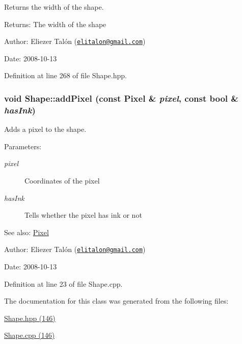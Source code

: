 Returns the width of the shape. 

\begin{Desc}
\item[Returns:]The width of the shape\end{Desc}
\begin{Desc}
\item[Author:]Eliezer Talón (\href{mailto:elitalon@gmail.com}{\tt elitalon@gmail.com}) \end{Desc}
\begin{Desc}
\item[Date:]2008-10-13 \end{Desc}


Definition at line 268 of file Shape.hpp.\hypertarget{class_shape_813980f9a7b40e042a148c6ce5192111}{
\subsubsection[addPixel]{\setlength{\rightskip}{0pt plus 5cm}void Shape::addPixel (const {\bf Pixel} \& {\em pixel}, \/  const bool \& {\em hasInk})}}
\label{class_shape_813980f9a7b40e042a148c6ce5192111}


Adds a pixel to the shape. 

\begin{Desc}
\item[Parameters:]
\begin{description}
\item[{\em pixel}]Coordinates of the pixel \item[{\em hasInk}]Tells whether the pixel has ink or not\end{description}
\end{Desc}
\begin{Desc}
\item[See also:]\hyperlink{_pixel_8hpp_535e59456e3e633842529cfa8ea103c4}{Pixel}\end{Desc}
\begin{Desc}
\item[Author:]Eliezer Talón (\href{mailto:elitalon@gmail.com}{\tt elitalon@gmail.com}) \end{Desc}
\begin{Desc}
\item[Date:]2008-10-13 \end{Desc}


Definition at line 23 of file Shape.cpp.

The documentation for this class was generated from the following files:\begin{CompactItemize}
\item 
\hyperlink{_shape_8hpp}{Shape.hpp (146)}\item 
\hyperlink{_shape_8cpp}{Shape.cpp (146)}\end{CompactItemize}
